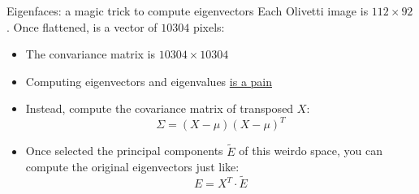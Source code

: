 \begin{frame}{Eigenfaces: a magic trick to compute eigenvectors}
Each Olivetti image is $112\times 92$. Once flattened, is a vector of $10304$ pixels:
\begin{itemize}
\item The convariance matrix is $10304\times 10304$
\item Computing eigenvectors and eigenvalues \underline{is a pain}
\item Instead, compute the covariance matrix of transposed $X$:
\begin{equation*}
\Sigma = (X-\mu)(X-\mu)^T
\end{equation*}
\item Once selected the principal components $\tilde{E}$ of this weirdo space, you can compute the original eigenvectors just like:
\begin{equation*}
E = X^T\cdot \tilde{E}
\end{equation*}
\end{itemize}
\end{frame}